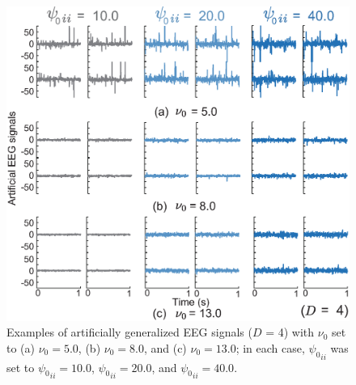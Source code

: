 \documentclass[journal]{IEEEtran}
\begin{document}
\begin{figure}[t]
\centering
\includegraphics[width=1.0\hsize]{figure/simulation_EEG_3.eps}
\caption{Examples of artificially generalized EEG signals ($D$ = 4) with $\nu_0$ set to (a) $\nu_0 = 5.0$, (b) $\nu_0 = 8.0$, and (c) $\nu_0 = 13.0$; in each case, ${{\psi_0}_{ii}}$ was set to ${{\psi_0}_{ii}} = 10.0$, ${{\psi_0}_{ii}} = 20.0$, and ${{\psi_0}_{ii}} = 40.0$.}
\label{fig:sim_EEG}
\end{figure}
\end{document}
